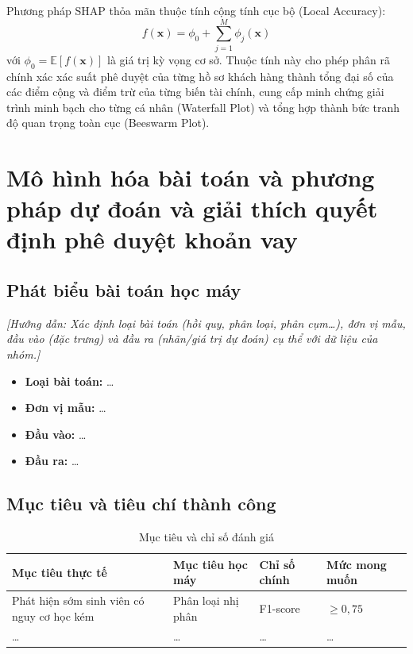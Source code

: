 \documentclass[12pt,a4paper,oneside]{report}
\newcommand{\tenbaitoan}{dự đoán và giải thích quyết định phê duyệt khoản vay}
\newcommand{\huongdan}[1]{{\color{guide}\itshape [Hướng dẫn: #1]}}
\begin{document}
Phương pháp SHAP thỏa mãn thuộc tính cộng tính cục bộ (Local Accuracy):
\begin{equation}
    f(\mathbf{x}) = \phi_0 + \sum_{j=1}^{M} \phi_j(\mathbf{x})
\end{equation}
với $\phi_0 = \mathbb{E}[f(\mathbf{x})]$ là giá trị kỳ vọng cơ sở. Thuộc tính này cho phép phân rã chính xác xác suất phê duyệt của từng hồ sơ khách hàng thành tổng đại số của các điểm cộng và điểm trừ của từng biến tài chính, cung cấp minh chứng giải trình minh bạch cho từng cá nhân (Waterfall Plot) và tổng hợp thành bức tranh độ quan trọng toàn cục (Beeswarm Plot).
\chapter{Mô hình hóa bài toán và phương pháp \tenbaitoan}
\label{chap:phuongphap}

\section{Phát biểu bài toán học máy}
\huongdan{Xác định loại bài toán (hồi quy, phân loại, phân cụm\dots), đơn vị
mẫu, đầu vào (đặc trưng) và đầu ra (nhãn/giá trị dự đoán) cụ thể với dữ liệu
của nhóm.}

\begin{itemize}
  \item \textbf{Loại bài toán:} \dots
  \item \textbf{Đơn vị mẫu:} \dots
  \item \textbf{Đầu vào:} \dots
  \item \textbf{Đầu ra:} \dots
\end{itemize}

\section{Mục tiêu và tiêu chí thành công}

\begin{table}[H]
  \centering
  \caption{Mục tiêu và chỉ số đánh giá}
  \label{tab:muctieu}
  \begin{tabularx}{\textwidth}{>{\raggedright\arraybackslash}X >{\raggedright\arraybackslash}X
                               >{\centering\arraybackslash}p{2.8cm} >{\centering\arraybackslash}p{2.8cm}}
    \toprule
    \textbf{Mục tiêu thực tế} & \textbf{Mục tiêu học máy} & \textbf{Chỉ số chính} & \textbf{Mức mong muốn} \\
    \midrule
    Phát hiện sớm sinh viên có nguy cơ học kém & Phân loại nhị phân & F1-score & $\geq 0{,}75$ \\
    \dots & \dots & \dots & \dots \\
    \bottomrule
  \end{tabularx}
\end{table}
\end{document}
